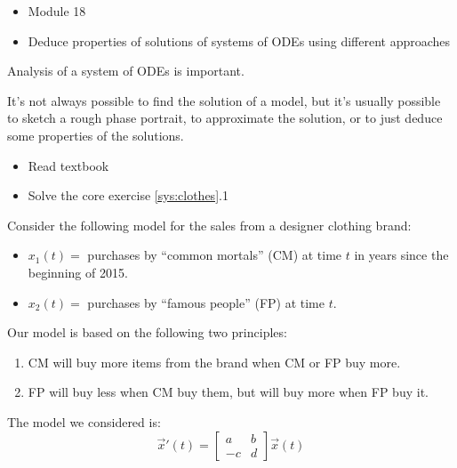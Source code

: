 \begin{lesson}

	\begin{itemize}
		\item Module 18
	\end{itemize}

	\begin{itemize}
		\item Deduce properties of solutions of systems of ODEs using different approaches
	\end{itemize}
	

Analysis of a system of ODEs is important.

It's not always possible to find the solution of a model, but it's usually possible to sketch a rough phase portrait, to approximate the solution, or to just deduce some properties of the solutions.


\begin{itemize}
	\item Read textbook
	\item Solve the core exercise \ref{sys:clothes}.1
\end{itemize}

\end{lesson}




\question \label{sys:clothes}
	Consider the following model for the sales from a designer clothing brand:
	\begin{itemize}
	\item $x_1(t) = $ purchases by ``common mortals'' (CM) at time $t$ in years since the beginning of 2015.
	\item $x_2(t) = $ purchases by ``famous people'' (FP) at time $t$.
	\end{itemize}
	
	Our model is based on the following two principles:
	\begin{enumerate}[label={($P_{\arabic*}$)}]
		\item CM will buy more items from the brand when CM or FP buy more.
		\item FP will buy less when CM buy them, but will buy more when FP buy it.
	\end{enumerate}

	The model we considered is:
	$$
	\vec{x}'(t) = 
	\begin{bmatrix}
 		a & b \\
 		-c & d
	\end{bmatrix}
	\vec{x}(t)
	$$
	
